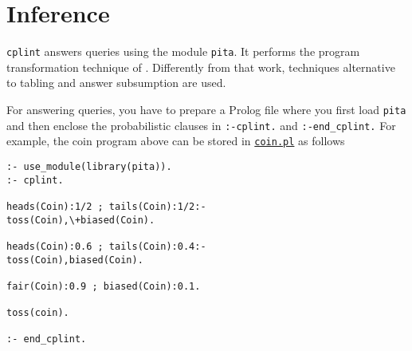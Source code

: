 \section{Inference}
\label{inf}
\texttt{cplint} answers queries using the module \verb|pita|. It performs the program transformation technique of \cite{RigSwi10-ICLP10-IC}. Differently from that work, techniques alternative to tabling and answer subsumption are used.

For answering queries, you have to prepare a Prolog file where you first load \texttt{pita} and then enclose the probabilistic 
clauses in \texttt{:-cplint.} and \texttt{:-end\_cplint.} For example, the coin program above can be stored in \href{http://cplint.lamping.unife.it/example/coin.pl}{\texttt{coin.pl}} as follows
\begin{verbatim}
:- use_module(library(pita)).
:- cplint.

heads(Coin):1/2 ; tails(Coin):1/2:- 
toss(Coin),\+biased(Coin).

heads(Coin):0.6 ; tails(Coin):0.4:- 
toss(Coin),biased(Coin).

fair(Coin):0.9 ; biased(Coin):0.1.

toss(coin).

:- end_cplint.
\end{verbatim}
